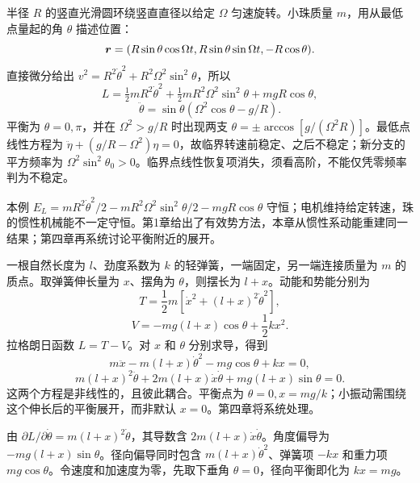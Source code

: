 \begin{example}
半径 $R$ 的竖直光滑圆环绕竖直直径以给定 $\Omega$ 匀速旋转。小珠质量 $m$，用从最低点量起的角 $\theta$ 描述位置：
\[
\boldsymbol{r}=(R\sin\theta\cos\Omega t,R\sin\theta\sin\Omega t,-R\cos\theta).
\]
直接微分给出 $v^2=R^2\dot\theta^2+R^2\Omega^2\sin^2\theta$，所以
\[
L=\tfrac12mR^2\dot\theta^2+\tfrac12mR^2\Omega^2\sin^2\theta+mgR\cos\theta,
\]
\[
\ddot\theta=\sin\theta(\Omega^2\cos\theta-g/R).
\]
平衡为 $\theta=0,\pi$，并在 $\Omega^2>g/R$ 时出现两支 $\theta=\pm\arccos[g/(\Omega^2R)]$。最低点线性方程为 $\ddot\eta+(g/R-\Omega^2)\eta=0$，故临界转速前稳定、之后不稳定；新分支的平方频率为 $\Omega^2\sin^2\theta_0>0$。临界点线性恢复项消失，须看高阶，不能仅凭零频率判为不稳定。

本例 $E_L=mR^2\dot\theta^2/2-mR^2\Omega^2\sin^2\theta/2-mgR\cos\theta$ 守恒；电机维持给定转速，珠的惯性机械能不一定守恒。第1章给出了有效势方法，本章从惯性系动能重建同一结果；第四章再系统讨论平衡附近的展开。
\end{example}

\begin{example}[弹簧摆]
一根自然长度为 $l$、劲度系数为 $k$ 的轻弹簧，一端固定，另一端连接质量为 $m$ 的质点。取弹簧伸长量为 $x$、摆角为 $\theta$，则摆长为 $l+x$。动能和势能分别为
\[
T=\frac12m\left[\dot x^2+(l+x)^2\dot\theta^2\right],
\]
\[
V=-mg(l+x)\cos\theta+\frac12kx^2.
\]
拉格朗日函数 $L=T-V$。对 $x$ 和 $\theta$ 分别求导，得到
\[
m\ddot x-m(l+x)\dot\theta^2-mg\cos\theta+kx=0,
\]
\[
m(l+x)^2\ddot\theta+2m(l+x)\dot x\dot\theta
+mg(l+x)\sin\theta=0.
\]
这两个方程是非线性的，且彼此耦合。平衡点为 $\theta=0,x=mg/k$；小振动需围绕这个伸长后的平衡展开，而非默认 $x=0$。第四章将系统处理。

由 $\partial L/\partial\dot\theta=m(l+x)^2\dot\theta$，其导数含 $2m(l+x)\dot x\dot\theta$。角度偏导为 $-mg(l+x)\sin\theta$。径向偏导同时包含 $m(l+x)\dot\theta^2$、弹簧项 $-kx$ 和重力项 $mg\cos\theta$。令速度和加速度为零，先取下垂角 $\theta=0$，径向平衡即化为 $kx=mg$。
\end{example}

